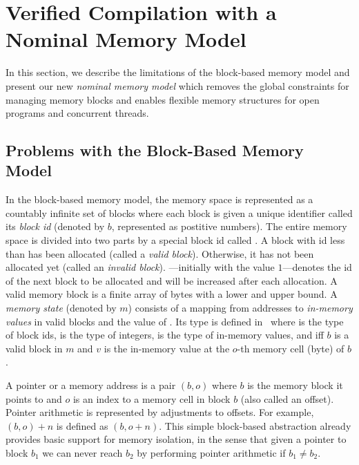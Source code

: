 \section{Verified Compilation with a Nominal Memory Model}
\label{sec:nominal}

In this section, we describe the limitations of the block-based
memory model and present our new 
{\em nominal memory model} which removes the global constraints for
managing memory blocks and enables flexible memory structures for open
programs and concurrent threads.

\subsection{Problems with the Block-Based Memory Model}
\label{ssec:nominal-bbmm}

In the block-based memory model, the memory space is represented as a
countably infinite set of blocks where each block is given a unique
identifier called its \emph{block id} (denoted by $b$, represented
as postitive numbers). The entire memory space is
divided into two parts by a special block id called
\emph{\nextblock}. A block with id less than \nextblock has been
allocated (called a \emph{valid block}). Otherwise, it has not been
allocated yet (called an \emph{invalid block}). \nextblock---initially
with the value $1$---denotes the id of the next block to be allocated
and will be increased after each allocation. A valid memory block is a
finite array of bytes with a lower and upper bound. A \emph{memory
state} (denoted by $m$) consists of a mapping from addresses to
\emph{in-memory values} in valid blocks and the value of
\nextblock. Its type  is defined in~
where  is the type of block ids,  is the type of
integers,  is the type of in-memory values, and
 iff $b$ is a valid block in
$m$ and $v$ is the in-memory value at the $o$-th memory cell (byte) of
$b$.

A pointer or a memory address is a pair $(b, o)$ where $b$ is the
memory block it points to and $o$ is an index to a memory cell in block
$b$ (also called an offset).
%
Pointer arithmetic is represented by adjustments to offsets. For
example, $(b, o) + n$ is defined as $(b, o+n)$.
%
This simple block-based abstraction already provides basic support for
memory isolation, in the sense that given a pointer to block $b_1$ we
can never reach $b_2$ by performing pointer arithmetic if $b_1 \neq b_2$.


